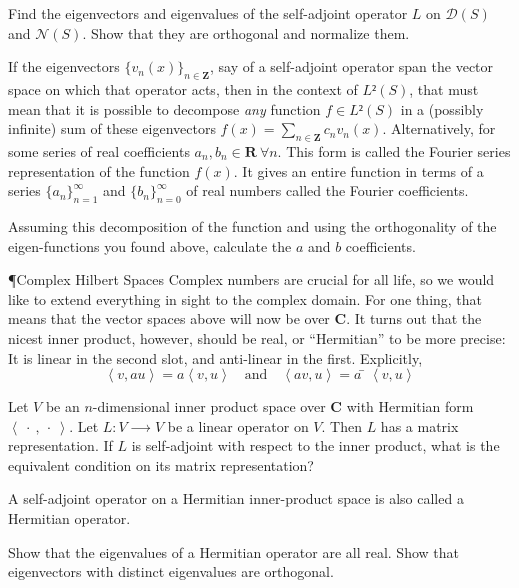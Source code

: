 \begin{exercise} 
Find the eigenvectors and eigenvalues of the self-adjoint operator $L$ on $𝒟(S)$ and $𝒩(S)$. Show that they are orthogonal and normalize them.
\end{exercise}

If the eigenvectors $\{v_n(x)\}_{n∈ 𝐙}$, say of a self-adjoint operator span the vector space on which that operator acts, then in the context of $L²(S)$, that must mean that it is possible to decompose {\em any} function $f∈ L²(S)$ in a (possibly infinite) sum of these eigenvectors $f(x) = \sum_{n∈ 𝐙} c_n v_n(x)$. Alternatively, 
for some series of real coefficients $a_n, b_n ∈ 𝐑\ \forall n$.
This form is called the Fourier series representation of the function $f(x)$. It gives an entire function in terms of a series $\{a_n\}_{n=1}^∞$ and $\{b_n\}_{n=0}^∞$ of real numbers called the Fourier coefficients. 

\begin{exercise} 
Assuming this decomposition of the function and using the orthogonality of the eigen-functions you found above, calculate the $a$ and $b$ coefficients. 
\end{exercise}



¶{Complex Hilbert Spaces}
Complex numbers are crucial for all life, so we would like to extend everything in sight to the complex domain. For one thing, that means that the vector spaces above will now be over $𝐂$. It turns out that the nicest inner product, however, should be real, or “Hermitian” to be more precise: It is linear in the second slot, and anti-linear in the first. 
Explicitly, 
$$
\left< v, a u\right>  = a \left< v,  u\right>  \quad \textrm{and} \quad \left< av, u\right>  = ā \left< v,  u\right>  
$$

\begin{exercise} 
Let $V$ be an $n$-dimensional inner product space over $𝐂$ with Hermitian form $\left<\ ⋅\ ,\ ⋅\ \right>$. 
Let $L : V ⟶ V$ be a linear operator on $V$. Then $L$ has a matrix representation. If $L$ is self-adjoint with respect to the inner product, what is the equivalent condition on its matrix representation? 
\end{exercise}
A self-adjoint operator on a Hermitian inner-product space is also called a Hermitian operator. 
\begin{exercise} 
Show that the eigenvalues of a Hermitian operator are all real. Show that eigenvectors with distinct eigenvalues are orthogonal. 
\end{exercise}


